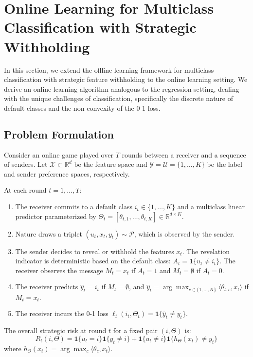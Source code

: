 \documentclass[11pt]{article}
\begin{document}
\section{Online Learning for Multiclass Classification with Strategic Withholding}

In this section, we extend the offline learning framework for multiclass classification with strategic feature withholding to the online learning setting. We derive an online learning algorithm analogous to the regression setting, dealing with the unique challenges of classification, specifically the discrete nature of default classes and the non-convexity of the 0-1 loss.

\subsection{Problem Formulation}

Consider an online game played over $T$ rounds between a receiver and a sequence of senders. Let $\mathcal{X} \subset \mathbb{R}^d$ be the feature space and $\mathcal{Y} = \mathcal{U} = \{1, \dots, K\}$ be the label and sender preference spaces, respectively.

At each round $t = 1, \dots, T$:
\begin{enumerate}
    \item The receiver commits to a default class $i_t \in \{1, \dots, K\}$ and a multiclass linear predictor parameterized by $\Theta_t = [\theta_{t,1}, \dots, \theta_{t,K}] \in \mathbb{R}^{d \times K}$.
    \item Nature draws a triplet $(u_t, x_t, y_t) \sim \mathcal{P}$, which is observed by the sender.
    \item The sender decides to reveal or withhold the features $x_t$. The revelation indicator is deterministic based on the default class: $A_t = \mathbf{1}\{u_t \neq i_t\}$. The receiver observes the message $M_t = x_t$ if $A_t = 1$ and $M_t = \emptyset$ if $A_t = 0$.
    \item The receiver predicts $\hat{y}_t = i_t$ if $M_t = \emptyset$, and $\hat{y}_t = \arg\max_{c \in \{1, \dots, K\}} \langle \theta_{t,c}, x_t \rangle$ if $M_t = x_t$.
    \item The receiver incurs the 0-1 loss $\ell_t(i_t, \Theta_t) = \mathbf{1}\{\hat{y}_t \neq y_t\}$.
\end{enumerate}

The overall strategic risk at round $t$ for a fixed pair $(i, \Theta)$ is:
\begin{equation}
    R_t(i, \Theta) = \mathbf{1}\{u_t = i\}\mathbf{1}\{y_t \neq i\} + \mathbf{1}\{u_t \neq i\}\mathbf{1}\{h_{\Theta}(x_t) \neq y_t\}
\end{equation}
where $h_{\Theta}(x_t) = \arg\max_{c} \langle \theta_{c}, x_t \rangle$.
\end{document}
